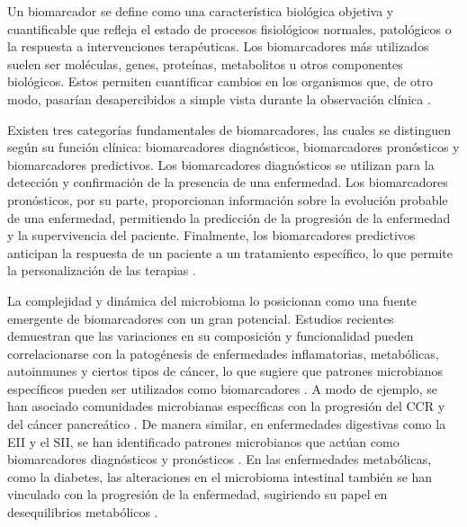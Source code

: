Un biomarcador se define como una característica biológica objetiva y cuantificable que refleja el estado de procesos fisiológicos normales, patológicos o la respuesta a intervenciones terapéuticas. Los biomarcadores más utilizados suelen ser moléculas, genes, proteínas, metabolitos u otros componentes biológicos. Estos permiten cuantificar cambios en los organismos que, de otro modo, pasarían desapercibidos a simple vista durante la observación clínica \cite{strimbu2010biomarkers}.

Existen tres categorías fundamentales de biomarcadores, las cuales se distinguen según su función clínica: biomarcadores diagnósticos, biomarcadores pronósticos y biomarcadores predictivos. Los biomarcadores diagnósticos se utilizan para la detección y confirmación de la presencia de una enfermedad. Los biomarcadores pronósticos, por su parte, proporcionan información sobre la evolución probable de una enfermedad, permitiendo la predicción de la progresión de la enfermedad y la supervivencia del paciente. Finalmente, los biomarcadores predictivos anticipan la respuesta de un paciente a un tratamiento específico, lo que permite la personalización de las terapias \cite{strimbu2010biomarkers}.


La complejidad y dinámica del microbioma lo posicionan como una fuente emergente de biomarcadores con un gran potencial. Estudios recientes demuestran que las variaciones en su composición y funcionalidad pueden correlacionarse con la patogénesis de enfermedades inflamatorias, metabólicas, autoinmunes y ciertos tipos de cáncer, lo que sugiere que patrones microbianos específicos pueden ser utilizados como biomarcadores \cite{hajjo2022unlocking, ayakdacs2023microbiota, duttagupta2023gut, carr2025personalized, eslami2025microbiota}. A modo de ejemplo, se han asociado comunidades microbianas específicas con la progresión del CCR \cite{wirbel2019meta, wang2023fusobacterium, conde2024multispecies} y del cáncer pancreático \cite{kartal2022faecal, nagata2022metagenomic, pourali2024microbiome}. De manera similar, en enfermedades digestivas como la EII y el SII, se han identificado patrones microbianos que actúan como biomarcadores diagnósticos y pronósticos \cite{mousa2024gut, meade2023gut, metwaly2022microbiome}. En las enfermedades metabólicas, como la diabetes, las alteraciones en el microbioma intestinal también se han vinculado con la progresión de la enfermedad, sugiriendo su papel en desequilibrios metabólicos \cite{metwaly2022microbiome, gao2022cross, rold2024identifying}.

